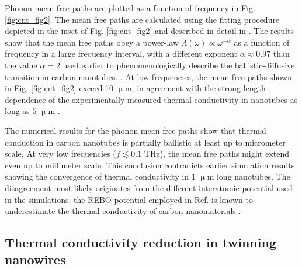Phonon mean free paths are plotted as a function of frequency in Fig. \ref{fig:cnt_fig2}. The mean free paths are calculated using the fitting procedure depicted in the inset of Fig. \ref{fig:cnt_fig2} and described in detail in . The results show that the mean free paths obey a power-law $\Lambda(\omega)\propto \omega^{-\alpha}$ as a function of frequency in a large frequency interval, with a different exponent $\alpha\approx 0.97$ than the value $\alpha=2$ used earlier \cite{wang06_apl} to phenomenologically describe the ballistic-diffusive transition in carbon nanotubes. . At low frequencies, the mean free paths shown in Fig. \ref{fig:cnt_fig2} exceed 10 $\upmu$m, in agreement with the strong length-dependence of the experimentally measured thermal conductivity in nanotubes as long as $5$ $\upmu$m \cite{chang08}. 

The numerical results for the phonon mean free paths show that thermal conduction in carbon nanotubes is partially ballistic at least up to micrometer scale. At very low frequencies ($f\lesssim 0.1$ THz), the mean free paths might extend even up to millimeter scale. This conclusion contradicts earlier simulation results \cite{thomas10b} showing the convergence of thermal conductivity in 1 $\upmu$m long nanotubes. The disagreement most likely originates from the different interatomic potential used in the simulations: the REBO potential \cite{brenner02} employed in Ref. \cite{thomas10b} is known to underestimate the thermal conductivity of carbon nanomaterials \cite{salaway14}. 



\subsection{Thermal conductivity reduction in twinning nanowires}

